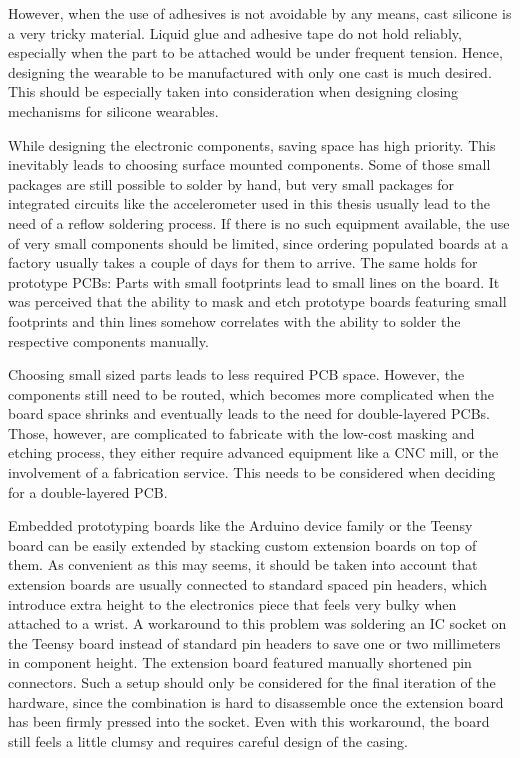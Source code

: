 However, when the use of adhesives is not avoidable by any means, cast silicone is a very tricky material. Liquid glue and adhesive tape do not hold reliably, especially when the part to be attached would be under frequent tension. Hence, designing the wearable to be manufactured with only one cast is much desired. This should be especially taken into consideration when designing closing mechanisms for silicone wearables.

While designing the electronic components, saving space has high priority. This inevitably leads to choosing surface mounted components. Some of those small packages are still possible to solder by hand, but very small packages for integrated circuits like the accelerometer used in this thesis usually lead to the need of a reflow soldering process. If there is no such equipment available, the use of very small components should be limited, since ordering populated boards at a factory usually takes a couple of days for them to arrive. The same holds for prototype \ac{PCB}s: Parts with small footprints lead to small lines on the board. It was perceived that the ability to mask and etch prototype boards featuring small footprints and thin lines somehow correlates with the ability to solder the respective components manually.

Choosing small sized parts leads to less required \ac{PCB} space. However, the components still need to be routed, which becomes more complicated when the board space shrinks and eventually leads to the need for double-layered \ac{PCB}s. Those, however, are complicated to fabricate with the low-cost masking and etching process, they either require advanced equipment like a CNC mill, or the involvement of a fabrication service. This needs to be considered when deciding for a double-layered \ac{PCB}.

Embedded prototyping boards like the Arduino device family or the Teensy board can be easily extended by stacking custom extension boards on top of them. As convenient as this may seems, it should be taken into account that extension boards are usually connected to standard spaced pin headers, which introduce extra height to the electronics piece that feels very bulky when attached to a wrist. A workaround to this problem was soldering an IC socket on the Teensy board instead of standard pin headers to save one or two millimeters in component height. The extension board featured manually shortened pin connectors. Such a setup should only be considered for the final iteration of the hardware, since the combination is hard to disassemble once the extension board has been firmly pressed into the socket. Even with this workaround, the board still feels a little clumsy and requires careful design of the casing.

